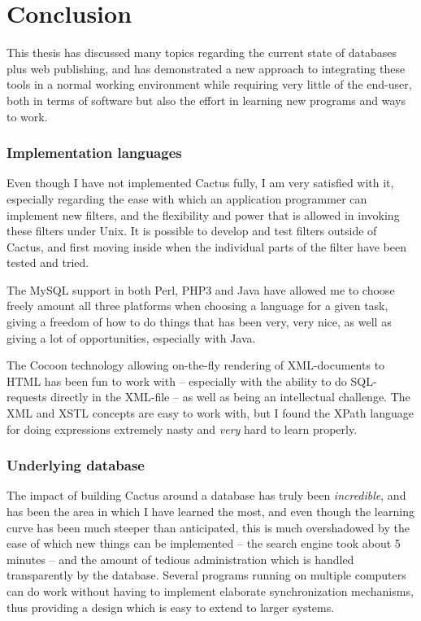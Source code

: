 \chapter{Conclusion}

This thesis has discussed many topics regarding the current state of
databases plus web publishing, and has demonstrated a new approach to
integrating these tools in a normal working environment while
requiring very little of the end-user, both in terms of software but
also the effort in learning new programs and ways to work.

\subsection*{Implementation languages}

Even though I have not implemented Cactus fully, I am very satisfied
with it, especially regarding the ease with which an application
programmer can implement new filters, and the flexibility and power
that is allowed in invoking these filters under Unix.  It is possible
to develop and test filters outside of Cactus, and first moving inside
when the individual parts of the filter have been tested and tried.

The MySQL support in both Perl, PHP3 and Java have allowed me to
choose freely amount all three platforms when choosing a language for
a given task, giving a freedom of how to do things that has been very,
very nice, as well as giving a lot of opportunities, especially with
Java.

The Cocoon technology allowing on-the-fly rendering of XML-documents
to HTML has been fun to work with -- especially with the ability to do
SQL-requests directly in the XML-file -- as well as being an
intellectual challenge.  The XML and XSTL concepts are easy to work
with, but I found the XPath language for doing expressions extremely
nasty and \textit{very} hard to learn properly.



\subsection*{Underlying database}

The impact of building Cactus around a database has truly been
\textit{incredible}, and has been the area in which I have learned the
most, and even though the learning curve has been much steeper than
anticipated, this is much overshadowed by the ease of which new things
can be implemented -- the search engine took about 5 minutes -- and
the amount of tedious administration which is handled transparently by
the database.  Several programs running on multiple computers can do
work without having to implement elaborate synchronization mechanisms,
thus providing a design which is easy to extend to larger systems.

